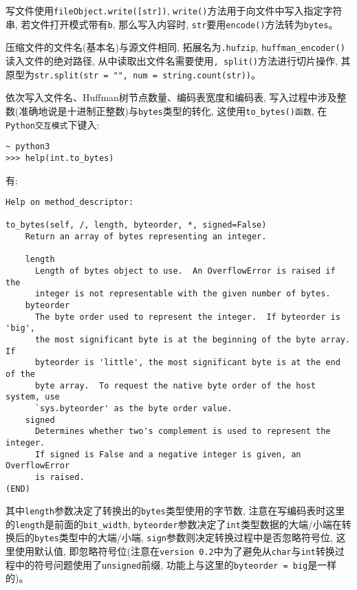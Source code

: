 \documentclass[a4paper]{ctexart}
\begin{document}
写文件使用\texttt{fileObject.write({[}str{]})}, \texttt{write()}方法用于向文件中写入指定字符串, 若文件打开模式带有\texttt{\textquotesingle{}b\textquotesingle{}}, 那么写入内容时, \texttt{str}要用\texttt{encode()}方法转为\texttt{bytes}。

压缩文件的文件名(基本名)与源文件相同, 拓展名为\texttt{.hufzip}, \texttt{huffman\_encoder()}读入文件的绝对路径, 从中读取出文件名需要使用\texttt{,\ split()}方法进行切片操作, 其原型为\texttt{str.split(str\ =\ "",\ num\ =\ string.count(str))}。

依次写入文件名、Huffman树节点数量、编码表宽度和编码表, 写入过程中涉及整数(准确地说是十进制正整数)与\texttt{bytes}类型的转化, 这使用\texttt{to\_bytes()函数}, 在\texttt{Python交互模式}下键入:

{\setmainfont{Courier New Bold}              
\begin{lstlisting}
~ python3
>>> help(int.to_bytes)
\end{lstlisting}}

有:

{\setmainfont{Courier New Bold}              
\begin{lstlisting}
Help on method_descriptor:

to_bytes(self, /, length, byteorder, *, signed=False)
    Return an array of bytes representing an integer.

    length
      Length of bytes object to use.  An OverflowError is raised if the
      integer is not representable with the given number of bytes.
    byteorder
      The byte order used to represent the integer.  If byteorder is 'big',
      the most significant byte is at the beginning of the byte array.  If
      byteorder is 'little', the most significant byte is at the end of the
      byte array.  To request the native byte order of the host system, use
      `sys.byteorder' as the byte order value.
    signed
      Determines whether two's complement is used to represent the integer.
      If signed is False and a negative integer is given, an OverflowError
      is raised.
(END)
\end{lstlisting}}

其中\texttt{length}参数决定了转换出的\texttt{bytes}类型使用的字节数, 注意在写编码表时这里的\texttt{length}是前面的\texttt{bit\_width}, \texttt{byteorder}参数决定了\texttt{int}类型数据的大端/小端在转换后的\texttt{bytes}类型中的大端/小端, \texttt{sign}参数则决定转换过程中是否忽略符号位, 这里使用默认值, 即忽略符号位(注意在\texttt{version\ 0.2}中为了避免从\texttt{char}与\texttt{int}转换过程中的符号问题使用了\texttt{unsigned}前缀, 功能上与这里的\texttt{byteorder\ =\ \textquotesingle{}big\textquotesingle{}}是一样的)。
\end{document}
